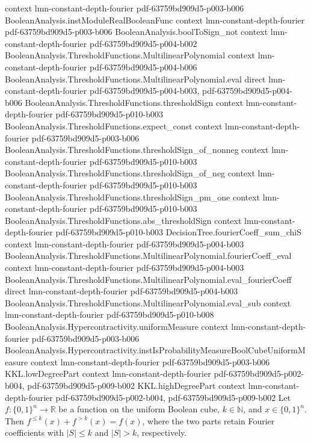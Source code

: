 \begin{lemma}
  {context}
  {lmn-constant-depth-fourier}
  {pdf-63759bd909d5-p003-b006}
\proofstep
  {BooleanAnalysis.instModuleRealBooleanFunc}
  {context}
  {lmn-constant-depth-fourier}
  {pdf-63759bd909d5-p003-b006}
\proofstep
  {BooleanAnalysis.boolToSign_not}
  {context}
  {lmn-constant-depth-fourier}
  {pdf-63759bd909d5-p004-b002}
\proofstep
  {BooleanAnalysis.ThresholdFunctions.MultilinearPolynomial}
  {context}
  {lmn-constant-depth-fourier}
  {pdf-63759bd909d5-p004-b006}
\proofstep
  {BooleanAnalysis.ThresholdFunctions.MultilinearPolynomial.eval}
  {direct}
  {lmn-constant-depth-fourier}
  {pdf-63759bd909d5-p004-b003,
    pdf-63759bd909d5-p004-b006}
\proofstep
  {BooleanAnalysis.ThresholdFunctions.thresholdSign}
  {context}
  {lmn-constant-depth-fourier}
  {pdf-63759bd909d5-p010-b003}
\proofstep
  {BooleanAnalysis.ThresholdFunctions.expect_const}
  {context}
  {lmn-constant-depth-fourier}
  {pdf-63759bd909d5-p003-b006}
\proofstep
  {BooleanAnalysis.ThresholdFunctions.thresholdSign_of_nonneg}
  {context}
  {lmn-constant-depth-fourier}
  {pdf-63759bd909d5-p010-b003}
\proofstep
  {BooleanAnalysis.ThresholdFunctions.thresholdSign_of_neg}
  {context}
  {lmn-constant-depth-fourier}
  {pdf-63759bd909d5-p010-b003}
\proofstep
  {BooleanAnalysis.ThresholdFunctions.thresholdSign_pm_one}
  {context}
  {lmn-constant-depth-fourier}
  {pdf-63759bd909d5-p010-b003}
\proofstep
  {BooleanAnalysis.ThresholdFunctions.abs_thresholdSign}
  {context}
  {lmn-constant-depth-fourier}
  {pdf-63759bd909d5-p010-b003}
\proofstep
  {DecisionTree.fourierCoeff_sum_chiS}
  {context}
  {lmn-constant-depth-fourier}
  {pdf-63759bd909d5-p004-b003}
\proofstep
  {BooleanAnalysis.ThresholdFunctions.MultilinearPolynomial.fourierCoeff_eval}
  {context}
  {lmn-constant-depth-fourier}
  {pdf-63759bd909d5-p004-b003}
\proofstep
  {BooleanAnalysis.ThresholdFunctions.MultilinearPolynomial.eval_fourierCoeff}
  {direct}
  {lmn-constant-depth-fourier}
  {pdf-63759bd909d5-p004-b003}
\proofstep
  {BooleanAnalysis.ThresholdFunctions.MultilinearPolynomial.eval_sub}
  {context}
  {lmn-constant-depth-fourier}
  {pdf-63759bd909d5-p010-b008}
\proofstep
  {BooleanAnalysis.Hypercontractivity.uniformMeasure}
  {context}
  {lmn-constant-depth-fourier}
  {pdf-63759bd909d5-p003-b006}
\proofstep
  {BooleanAnalysis.Hypercontractivity.instIsProbabilityMeasureBoolCubeUniformMeasure}
  {context}
  {lmn-constant-depth-fourier}
  {pdf-63759bd909d5-p003-b006}
\proofstep
  {KKL.lowDegreePart}
  {context}
  {lmn-constant-depth-fourier}
  {pdf-63759bd909d5-p002-b004,
    pdf-63759bd909d5-p009-b002}
\proofstep
  {KKL.highDegreePart}
  {context}
  {lmn-constant-depth-fourier}
  {pdf-63759bd909d5-p002-b004,
    pdf-63759bd909d5-p009-b002}
\label{KKL.low_plus_high_eq}
Let $f:\{0,1\}^n\to\mathbb R$ be a function on the uniform Boolean cube, $k\in\mathbb
N$, and $x\in\{0,1\}^n$. Then $f^{\le k}(x)+f^{>k}(x)=f(x)$, where the two parts retain
Fourier coefficients with $|S|\le k$ and $|S|>k$, respectively.
\end{lemma}

